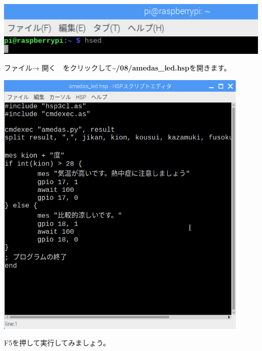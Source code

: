 \documentclass[a4paper,12pt,dvipdfmx]{jarticle}
\begin{document}
\begin{center}
\includegraphics[width=17.057cm]{textbook-img013.png}

\end{center}
ファイル→
開く　をクリックして\textbf{{\textasciitilde}/08/amedas\_led.hsp}を開きます。

\begin{center}
\includegraphics[width=12.173cm]{textbook-img038.png}

\end{center}

\bigskip


\bigskip

\clearpage
F5を押して実行してみましょう。
\end{document}
